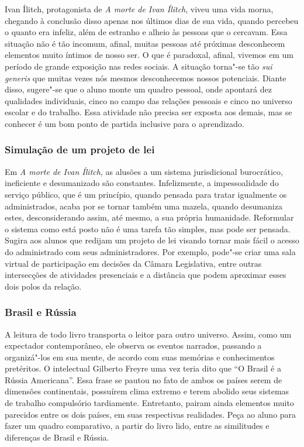 \documentclass[12pt]{extarticle}
\begin{document}
Ivan Ílitch, protagonista de \emph{A morte de Ivan Ílitch}, viveu uma
vida morna, chegando à conclusão disso apenas nos últimos dias de sua
vida, quando percebeu o quanto era infeliz, além de estranho e alheio
às pessoas que o cercavam. Essa situação não é tão incomum, afinal,
muitas pessoas até próximas desconhecem elementos muito íntimos de
nosso ser. O que é paradoxal, afinal, vivemos em um período de grande
exposição nas redes sociais. A situação torna"-se tão \emph{sui
generis} que muitas vezes nós mesmos desconhecemos nossos potenciais.
Diante disso, sugere"-se que o aluno monte um quadro pessoal, onde
apontará dez qualidades individuais, cinco no campo das relações
pessoais e cinco no universo escolar e do trabalho. Essa atividade não
precisa ser exposta aos demais, mas se conhecer é um bom ponto de
partida inclusive para o aprendizado.

\subsubsection{Simulação de um projeto de lei}


Em \emph{A morte de Ivan Ílitch}, as alusões a um sistema
jurisdicional burocrático, ineficiente e desumanizado são
constantes. Infelizmente, a impessoalidade do serviço público, que é
um princípio, quando pensada para tratar igualmente os
administrados, acaba por se tornar também uma mazela, quando
desumaniza estes, desconsiderando assim, até mesmo, a sua própria
humanidade. Reformular o sistema como está posto não é uma tarefa tão simples, mas pode ser pensada. Sugira aos alunos que redijam um projeto de
lei visando tornar mais fácil o acesso do administrado com seus
administradores. Por exemplo, pode"-se criar uma sala virtual de
participação em decisões da Câmara Legislativa, entre outras
intersecções de atividades presenciais e a distância que podem
aproximar esses dois polos da relação.

\subsubsection{Brasil e Rússia}


A leitura de todo livro transporta o leitor para outro universo.
Assim, como um expectador contemporâneo, ele observa os eventos
narrados, passando a organizá"-los em sua mente, de acordo com suas
memórias e conhecimentos pretéritos. O intelectual Gilberto Freyre uma
vez teria dito que ``O Brasil é a Rússia Americana''. Essa frase se
pautou no fato de ambos os países serem de dimensões continentais,
possuírem clima extremo e terem abolido seus sistemas de trabalho
compulsório tardiamente. Entretanto, pairam ainda elementos muito
parecidos entre os dois países, em suas respectivas realidades. Peça
ao aluno para fazer um quadro comparativo, a partir do livro lido,
entre as similitudes e diferenças de Brasil e Rússia.
\end{document}
